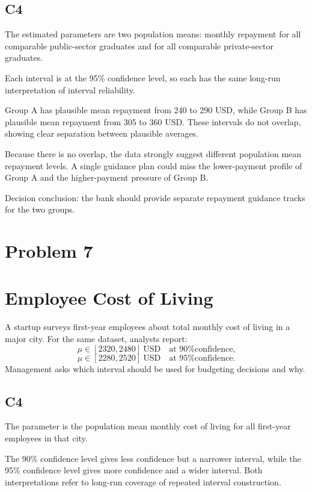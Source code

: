 \begin{ExamProblems}
		\subsection*{C4}
		The estimated parameters are two population means: monthly repayment for all comparable public-sector graduates and for all comparable private-sector graduates.

		Each interval is at the 95\% confidence level, so each has the same long-run interpretation of interval reliability.

		Group A has plausible mean repayment from 240 to 290 USD, while Group B has plausible mean repayment from 305 to 360 USD.
		These intervals do not overlap, showing clear separation between plausible averages.

		Because there is no overlap, the data strongly suggest different population mean repayment levels.
		A single guidance plan could miss the lower-payment profile of Group A and the higher-payment pressure of Group B.

		Decision conclusion: the bank should provide separate repayment guidance tracks for the two groups.

		\newpage
		\item
		\section{Problem 7}
		\section{Employee Cost of Living}
		A startup surveys first-year employees about total monthly cost of living in a major city.
		For the same dataset, analysts report:
		\[
		\mu \in [2320, 2480]\ \text{USD} \quad \text{at 90\% confidence,}
		\]
		\[
		\mu \in [2280, 2520]\ \text{USD} \quad \text{at 95\% confidence.}
		\]
		Management asks which interval should be used for budgeting decisions and why.

		\subsection*{C4}
		The parameter is the population mean monthly cost of living for all first-year employees in that city.

		The 90\% confidence level gives less confidence but a narrower interval, while the 95\% confidence level gives more confidence and a wider interval.
		Both interpretations refer to long-run coverage of repeated interval construction.


\end{ExamProblems}
